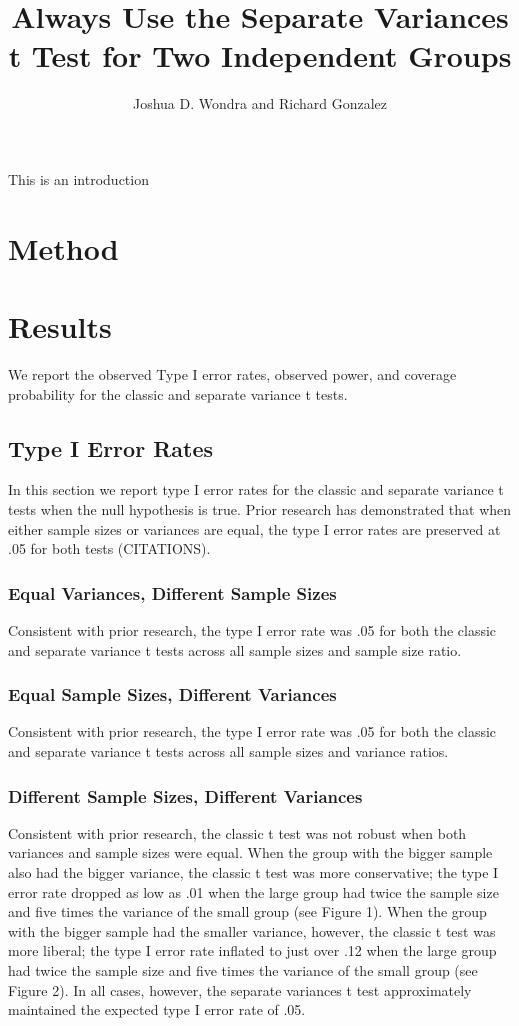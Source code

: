\documentclass[man]{apa6}\usepackage[]{graphicx}\usepackage[]{color}
\title{Always Use the Separate Variances t Test for Two Independent Groups}
\author{Joshua D. Wondra and Richard Gonzalez}
\affiliation{University of Michigan}
\begin{document}
\maketitle

This is an introduction

\section{Method}

\section{Results}



We report the observed Type I error rates, observed power, and coverage probability for the classic and separate variance t tests.

\subsection{Type I Error Rates}
In this section we report type I error rates for the classic and separate variance t tests when the null hypothesis is true. Prior research has demonstrated that when either sample sizes or variances are equal, the type I error rates are preserved at .05 for both tests (CITATIONS). 

\subsubsection{Equal Variances, Different Sample Sizes}
Consistent with prior research, the type I error rate was .05 for both the classic and separate variance t tests across all sample sizes and sample size ratio.

\subsubsection{Equal Sample Sizes, Different Variances}
Consistent with prior research, the type I error rate was .05 for both the classic and separate variance t tests across all sample sizes and variance ratios.

\subsubsection{Different Sample Sizes, Different Variances}
Consistent with prior research, the classic t test was not robust when both variances and sample sizes were equal. When the group with the bigger sample also had the bigger variance, the classic t test was more conservative; the type I error rate dropped as low as .01 when the large group had twice the sample size and five times the variance of the small group (see Figure 1). When the group with the bigger sample had the smaller variance, however, the classic t test was more liberal; the type I error rate inflated to just over .12 when the large group had twice the sample size and five times the variance of the small group (see Figure 2). In all cases, however, the separate variances t test approximately  maintained the expected type I error rate of .05.
\end{document}

